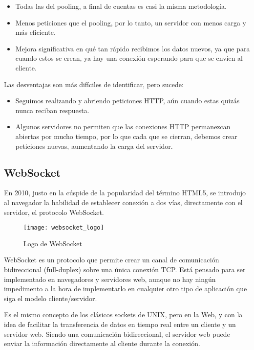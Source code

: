 \begin{itemize}
  \item Todas las del pooling, a final de cuentas es casi la misma metodología.
  \item Menos peticiones que el pooling, por lo tanto, un servidor con menos carga y más eficiente.
  \item Mejora significativa en qué tan rápido recibimos los datos nuevos, ya que para cuando estos se crean, ya hay una conexión esperando para que se envíen al cliente.
\end{itemize}

Las desventajas son más difíciles de identificar, pero sucede:

\begin{itemize}
  \item Seguimos realizando y abriendo peticiones HTTP, aún cuando estas quizás nunca reciban respuesta.
  \item Algunos servidores no permiten que las conexiones HTTP permanezcan abiertas por mucho tiempo, por lo que cada que se cierran, debemos crear peticiones nuevas, aumentando la carga del servidor.
\end{itemize}

\subsection{WebSocket}

En 2010, justo en la cúspide de la popularidad del término HTML5, se introdujo al navegador la habilidad de establecer conexión a dos vías, directamente con el servidor, el protocolo WebSocket.

\begin{figure}[htp!]
  \centering
  \texttt{[image: websocket\_logo]}
  \caption{Logo de WebSocket}
  \label{fig:websocket_logo}
\end{figure}

WebSocket es un protocolo que permite crear un canal de comunicación bidireccional (full-duplex) sobre una única conexión TCP. Está pensado para ser implementado en navegadores y servidores web, aunque no hay ningún impedimento a la hora de implementarlo en cualquier otro tipo de aplicación que siga el modelo cliente/servidor.

Es el mismo concepto de los clásicos sockets de UNIX, pero en la Web, y con la idea de facilitar la transferencia de datos en tiempo real entre un cliente y un servidor web. Siendo una comunicación bidireccional, el servidor web puede enviar la información directamente al cliente durante la conexión.

